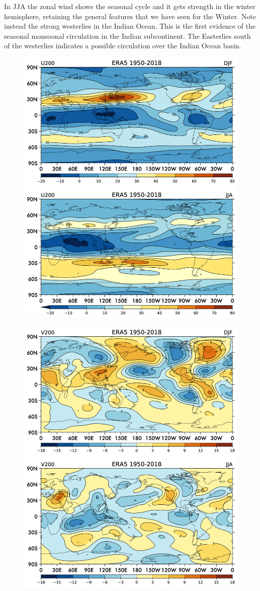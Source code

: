 In JJA the zonal wind shows the seasonal cycle and it gets strength in
the winter hemisphere, retaining the general features that we have seen
for the Winter. Note instead the strong westerlies in the Indian Ocean.
This is the first evidence of the seasonal monsoonal circulation in the
Indian subcontinent. The Easterlies south of the westerlies indicates a
possible circulation over the Indian Ocean basin.

\begin{figure}
\centering
\includegraphics[width = .7 \textwidth]{figs/GD/U200.png}
\caption{}\label{}
\end{figure}

\begin{figure}
\centering
\includegraphics[width = .7 \textwidth]{figs/GD/V200.png}
\caption{}\label{}
\end{figure}

